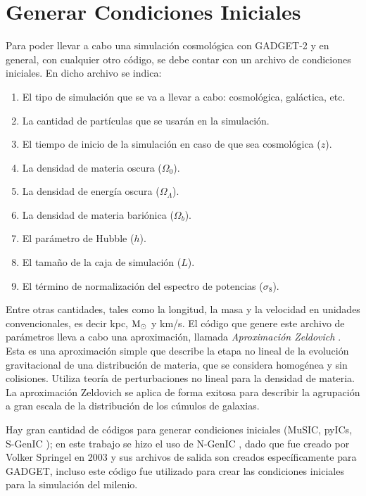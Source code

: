 \documentclass[a4paper,openright,12pt]{book}
\begin{document}
\section{Generar Condiciones Iniciales}
Para poder llevar a cabo una simulación cosmológica con GADGET-2 y en general, con cualquier otro código, se debe contar con un archivo de condiciones iniciales. En dicho archivo se indica:
\begin{enumerate}
\item El tipo de simulación que se va a llevar a cabo: cosmológica, galáctica, etc.
\item La cantidad de partículas que se usarán en la simulación.
\item El tiempo de inicio de la simulación en caso de que sea cosmológica ($z$).
\item La densidad de materia oscura ($\Omega_{0}$).
\item La densidad de energía oscura ($\Omega_{\Lambda}$).
\item La densidad de materia bariónica ($\Omega_{b}$).
\item El parámetro de Hubble ($h$).
\item El tamaño de la caja de simulación ($L$).
\item El término de normalización del espectro de potencias ($\sigma_{8}$).
\end{enumerate}
Entre otras cantidades, tales como la longitud, la masa y la velocidad en unidades convencionales, es decir kpc, $\textup M_{\odot}$ y km/s. El código que genere este archivo de parámetros lleva a cabo una aproximación, llamada \textit{Aproximación Zeldovich} \cite{4.1, 4.2}. Esta es una aproximación simple que describe la etapa no lineal de la evolución gravitacional de una distribución de materia, que se considera homogénea y sin colisiones. Utiliza teoría de perturbaciones no lineal para la densidad de materia. La aproximación Zeldovich se aplica de forma exitosa para describir la agrupación a gran escala de la distribución de los cúmulos de galaxias.

Hay gran cantidad de códigos para generar condiciones iniciales (MuSIC, pyICs, S-GenIC \cite{4.3}); en este trabajo se hizo el uso de N-GenIC \cite{3.0.3}, dado que fue creado por Volker Springel en 2003 y sus archivos de salida son creados específicamente para GADGET, incluso este código fue utilizado para crear las condiciones iniciales para la simulación del milenio.
\end{document}
